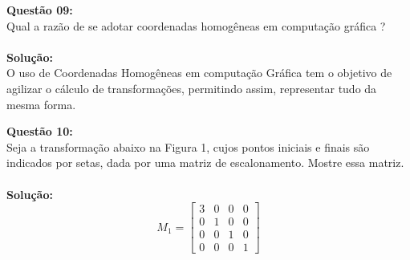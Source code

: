 \documentclass[10pt]{article}
\begin{document}
\vspace{1cm}
\noindent\textbf{Questão 09:}\\
Qual a razão de se adotar coordenadas homogêneas em computação gráfica ?\\
\\
\noindent\textbf{Solução:}
\\
O uso de Coordenadas Homogêneas em computação Gráfica tem o objetivo de agilizar 
o cálculo  de transformações, permitindo assim, representar tudo da mesma forma.

\vspace{1cm}
\noindent\textbf{Questão 10:}\\
Seja a transformação abaixo na Figura 1, cujos pontos iniciais e finais são indicados por setas,
dada por uma matriz de escalonamento. Mostre essa matriz.\\
\\
\noindent\textbf{Solução:}
\\

\[
  M_1 = 
  \begin{bmatrix}
        3 & 0 & 0 & 0\\
        0 & 1 & 0 & 0\\
        0 & 0 & 1 & 0\\
        0 & 0 & 0 & 1
    \end{bmatrix}
\]
\end{document}
